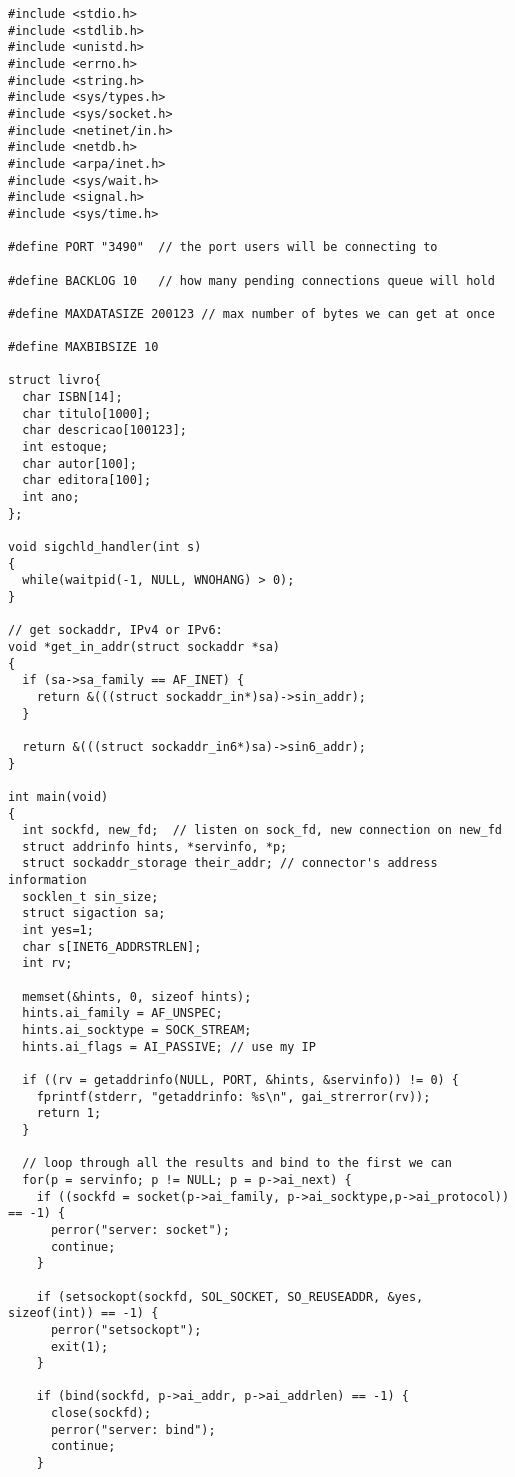 \documentclass[11pt, brazil]{article} %
\begin{document}
\begin{verbatim}
#include <stdio.h>
#include <stdlib.h>
#include <unistd.h>
#include <errno.h>
#include <string.h>
#include <sys/types.h>
#include <sys/socket.h>
#include <netinet/in.h>
#include <netdb.h>
#include <arpa/inet.h>
#include <sys/wait.h>
#include <signal.h>
#include <sys/time.h>

#define PORT "3490"  // the port users will be connecting to

#define BACKLOG 10	 // how many pending connections queue will hold

#define MAXDATASIZE 200123 // max number of bytes we can get at once

#define MAXBIBSIZE 10

struct livro{
  char ISBN[14];
  char titulo[1000];
  char descricao[100123];
  int estoque;
  char autor[100];
  char editora[100];
  int ano;
};

void sigchld_handler(int s)
{
  while(waitpid(-1, NULL, WNOHANG) > 0);
}

// get sockaddr, IPv4 or IPv6:
void *get_in_addr(struct sockaddr *sa)
{
  if (sa->sa_family == AF_INET) {
    return &(((struct sockaddr_in*)sa)->sin_addr);
  }

  return &(((struct sockaddr_in6*)sa)->sin6_addr);
}

int main(void)
{
  int sockfd, new_fd;  // listen on sock_fd, new connection on new_fd
  struct addrinfo hints, *servinfo, *p;
  struct sockaddr_storage their_addr; // connector's address information
  socklen_t sin_size;
  struct sigaction sa;
  int yes=1;
  char s[INET6_ADDRSTRLEN];
  int rv;

  memset(&hints, 0, sizeof hints);
  hints.ai_family = AF_UNSPEC;
  hints.ai_socktype = SOCK_STREAM;
  hints.ai_flags = AI_PASSIVE; // use my IP

  if ((rv = getaddrinfo(NULL, PORT, &hints, &servinfo)) != 0) {
    fprintf(stderr, "getaddrinfo: %s\n", gai_strerror(rv));
    return 1;
  }

  // loop through all the results and bind to the first we can
  for(p = servinfo; p != NULL; p = p->ai_next) {
    if ((sockfd = socket(p->ai_family, p->ai_socktype,p->ai_protocol)) == -1) {
      perror("server: socket");
      continue;
    }

    if (setsockopt(sockfd, SOL_SOCKET, SO_REUSEADDR, &yes, sizeof(int)) == -1) {
      perror("setsockopt");
      exit(1);
    }

    if (bind(sockfd, p->ai_addr, p->ai_addrlen) == -1) {
      close(sockfd);
      perror("server: bind");
      continue;
    }


\end{verbatim}
\end{document}
